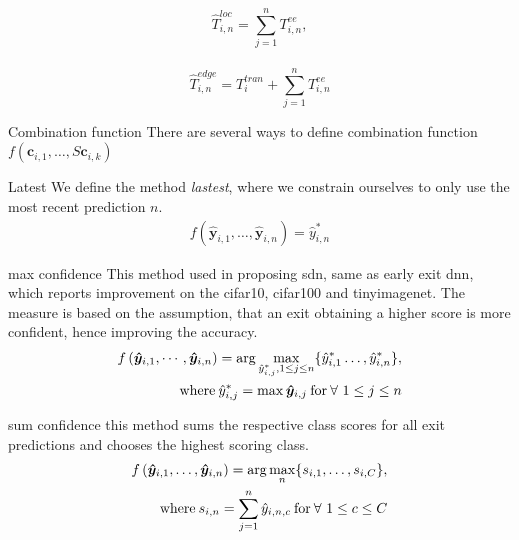 \begin{enumdescript}
		$$\hat{T}_{i,n}^{loc}=\sum_{j=1}^{n} T^{ee}_{i,n}, $$ \\
		$$\hat{T}_{i,n}^{edge}=T_{i}^{tran}+\sum_{j=1}^{n} T^{ee}_{i,n}$$
		
			\item[Combination function] There are several ways to define combination function $ f\left(\mathbf{c}_{i,1}, \dots,S \mathbf{c}_{i,k}\right) $
		\begin{enumdescript}
		
			
				\item[Latest] We define the method \emph{lastest}, where we constrain ourselves to only use the most recent prediction $n$.
				\begin{align}
					f\left(\bm{\hat{y}}_{i,1}, \dots, \bm{\hat{y}}_{i,n} \right) = \hat{y}_{i,n}^{*}
				\end{align}
				
				\item[max confidence] This method used in \cite{kaya_shallow-deep_nodate} proposing \gls{sdn}, same as early exit \gls{dnn}, which reports improvement on the \gls{cifar10}, \gls{cifar100} and \gls{tinyimagenet}. The measure is based on the assumption, that an exit obtaining a higher score is more confident, hence improving the accuracy.
				\begin{align}
				\begin{split}
				f\left(\bm{\hat{y}}_{i,1}, \cdots, \bm{\hat{y}}_{i,n} \right) = \arg \underset{{\hat{y}_{i,j}^{*}, 1 \le j 
						\le n}}{\max} \{\hat{y}_{i,1}^* \dots, \hat{y}_{i,n}^*\},\\ \text{where\:} \hat{y}_{i,j}^* = \max\bm{\hat{y}}_{i,j} \text{\:for\:} \forall \ 1 \le j \le n
				\end{split}	
				\end{align}
				\item[sum confidence] this method sums the respective class scores for all exit predictions and chooses the highest scoring class. 
				\begin{align}
				\begin{split}
				f\left(\bm{\hat{y}}_{i,1}, \dots, \bm{\hat{y}}_{i,n} \right) = \arg \underset{n}{\max} \{s_{i,1}, \dots, s_{i,C}\}, \\ \text{where\:} s_{i,n} = \sum_{j=1}^{n}\hat{y}_{i,n,c} \text{\:for\:} \forall \ 1\le c \le C
				\end{split}
				\end{align}


\end{enumdescript}
\end{enumdescript}
